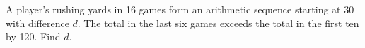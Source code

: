 A player's rushing yards in 16 games form an arithmetic sequence starting at 30 with difference $ d $. The total in the last six games exceeds the total in the first ten by 120. Find $ d $.

